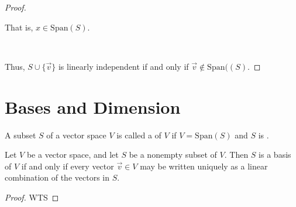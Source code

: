 \documentclass[11pt,fleqn]{book} %
\begin{document}
\begin{proof}
\begin{itemize}
        That is, $x\in \mathrm{Span}\left( S \right)$. 
    \end{itemize}
    
    {~~~}
    
    Thus, $S \cup \{\overrightarrow{v}\}$ is linearly independent if and only if $\overrightarrow{v} \notin \mathrm{Span}((S)$. 
\end{proof}

\section{Bases and Dimension}

\begin{definition}[Basis]
    A subset $S$ of a vector space $V$ is called a  of $V$ if $V = \mathrm{Span}(S)$ and $S$ is .
\end{definition}

\setcounter{dummy}{2}
\begin{theorem}
    Let $V$ be a vector space, and let $S$ be a nonempty subset of $V$. Then $S$ is a basis of $V$ if and only if every vector $\overrightarrow{v} \in V$ may be written uniquely as a linear combination of the vectors in $S$. 
\end{theorem}

\begin{proof}
    WTS
\end{proof}
\end{document}
